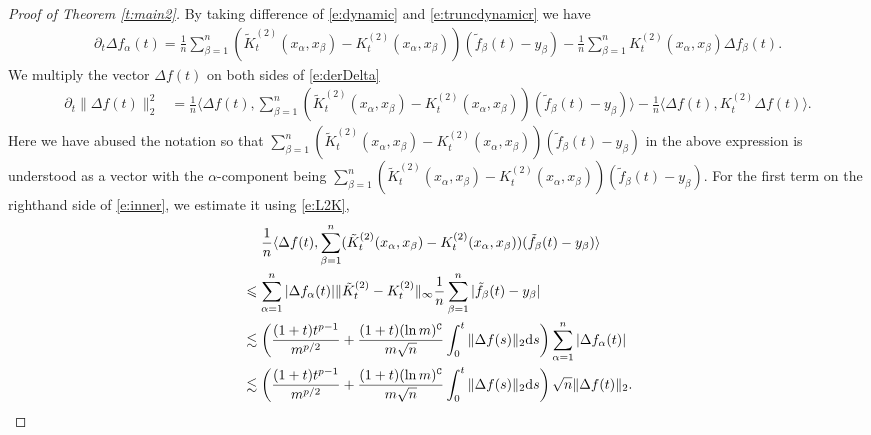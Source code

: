 \documentclass{article}
\numberwithin{equation}{section}
\newcommand{\fC}{{\mathtt C}}
\newcommand{\rd}{{\rm d}}
\newcommand{\al}{\alpha}
\renewcommand{\leq}{\leqslant}
\newcommand{\cor}{\color{darkred}}
\newcommand{\cob}{\color{darkblue}}
\newcommand{\nc}{\normalcolor}
\newcommand{\del}{\partial}
\newcommand{\1}{\mathds{1}}
\theoremstyle{plain} %
\begin{document}
\begin{proof}[Proof of Theorem \ref{t:main2}]
By taking difference of \eqref{e:dynamic} and \eqref{e:truncdynamicr} we have
\begin{align}\label{e:derDelta}
\del_t \Delta f_\al (t)=\frac{1}{n}\sum_{\beta=1}^n(\tilde K^{(2)}_t(x_\al,x_\beta)-K^{(2)}_t(x_\al, x_\beta))(\tilde f_\beta(t)-y_\beta)-\frac{1}{n}\sum_{\beta=1}^n K^{(2)}_t(x_\al, x_\beta)\Delta f_\beta(t).
\end{align}
We multiply the vector $\Delta f(t)$ on both sides of \eqref{e:derDelta}
\begin{align}\label{e:inner}
\del_t \|\Delta f(t)\|_2^2
&=\frac{1}{n}\langle \Delta f(t), \sum_{\beta=1}^n(\tilde K^{(2)}_t(x_\al,x_\beta)-K^{(2)}_t(x_\al, x_\beta))(\tilde f_\beta(t)-y_\beta)\rangle-\frac{1}{n}\langle \Delta f(t), K^{(2)}_t\Delta f(t)\rangle.
\end{align}
Here we have abused the notation so that 
$\sum_{\beta=1}^n(\tilde K^{(2)}_t(x_\al,x_\beta)-K^{(2)}_t(x_\al, x_\beta))(\tilde f_\beta(t)-y_\beta)$ 
in the above expression is understood  as a vector with the $\alpha$-component being $\sum_{\beta=1}^n(\tilde K^{(2)}_t(x_\al,x_\beta)-K^{(2)}_t(x_\al, x_\beta))(\tilde f_\beta(t)-y_\beta)$. 
For the first term on the righthand side of \eqref{e:inner}, we estimate it using \eqref{e:L2K},
\begin{align}\begin{split}\label{e:ttt1}
&\phantom{{}={}}\frac{1}{n}\langle \Delta f(t), \sum_{\beta=1}^n(\tilde K^{(2)}_t(x_\al,x_\beta)-K^{(2)}_t(x_\al, x_\beta))(\tilde f_\beta(t)-y_\beta)\rangle\\
&\leq \sum_{\al=1}^n |\Delta f_\al(t)|\|\tilde K_t^{(2)}-K^{(2)}_t\|_\infty\frac{1}{n}\sum_{\beta=1}^n|\tilde f_\beta(t)-y_\beta|\\
&\lesssim \left( \frac{(1+t)t^{p-1}}{m^{p/2}}+\frac{(1+t) (\ln m)^{\fC}}{m\sqrt {n}}\int_0^t \|\Delta f(s)\|_2\rd s\right)\sum_{\al=1}^n |\Delta f_\al(t)|\\
&\lesssim \left(\frac{(1+t)t^{p-1}}{m^{p/2}}+\frac{(1+t) (\ln m)^{\fC}}{m\sqrt {n}}\int_0^t \|\Delta f(s)\|_2\rd s \right)\sqrt n\|\Delta f(t)\|_2.
\end{split}\end{align}



\end{proof}
\end{document}
